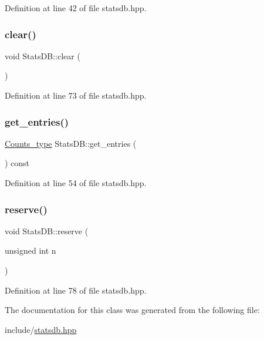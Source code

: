 Definition at line 42 of file statsdb.\+hpp.

\mbox{\label{class_stats_d_b_a5de68def55b0a3b99a8f609815624a00}} 
\subsubsection{\texorpdfstring{clear()}{clear()}}
{\footnotesize\ttfamily void Stats\+D\+B\+::clear (\begin{DoxyParamCaption}{ }\end{DoxyParamCaption})\hspace{0.3cm}{\ttfamily [inline]}}



Definition at line 73 of file statsdb.\+hpp.

\mbox{\label{class_stats_d_b_a8ed62f6a3939b90b3493de944c9b67fc}} 
\subsubsection{\texorpdfstring{get\+\_\+entries()}{get\_entries()}}
{\footnotesize\ttfamily \hyperlink{typedefs_8hpp_aee40fa17c1fddb63dd1f2b1470ade95b}{Counts\+\_\+type} Stats\+D\+B\+::get\+\_\+entries (\begin{DoxyParamCaption}{ }\end{DoxyParamCaption}) const\hspace{0.3cm}{\ttfamily [inline]}}



Definition at line 54 of file statsdb.\+hpp.

\mbox{\label{class_stats_d_b_a3370b7f2fb16aa047f8a938232a98602}} 
\subsubsection{\texorpdfstring{reserve()}{reserve()}}
{\footnotesize\ttfamily void Stats\+D\+B\+::reserve (\begin{DoxyParamCaption}\item[{unsigned int}]{n }\end{DoxyParamCaption})\hspace{0.3cm}{\ttfamily [inline]}}



Definition at line 78 of file statsdb.\+hpp.



The documentation for this class was generated from the following file\+:\begin{DoxyCompactItemize}
\item 
include/\hyperlink{statsdb_8hpp}{statsdb.\+hpp}\end{DoxyCompactItemize}
